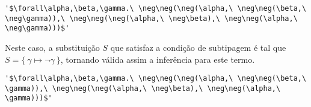 \lstset{extendedchars=false, escapeinside=''}
\begin{lstlisting}[style=output,caption={Tradução em CBV do tipo do combinador S}]
  '$\forall\alpha,\beta,\gamma.\ \neg\neg(\neg(\alpha,\ \neg\neg(\beta,\ \neg\gamma)),\ \neg\neg(\neg(\alpha,\ \neg\beta),\ \neg\neg(\alpha,\ \neg\gamma)))$'
\end{lstlisting}
Neste caso, a substituição $S$ que satisfaz a condição de subtipagem é tal que $S = \{\ \gamma \mapsto \neg\gamma\ \}$, tornando válida assim a inferência para este termo.
\lstset{extendedchars=false, escapeinside=''}
\begin{lstlisting}[style=output,caption={Inferência do tipo do combinador S traduzido em CBV}]
  '$\forall\alpha,\beta,\gamma.\ \neg\neg(\neg(\alpha,\ \neg\neg(\beta,\ \gamma)),\ \neg\neg(\neg(\alpha,\ \neg\beta),\ \neg\neg(\alpha,\ \gamma)))$'
\end{lstlisting}
